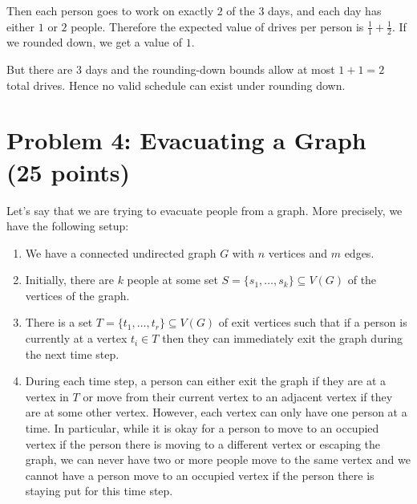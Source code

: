 \documentclass[12pt]{article}
\begin{document}
\begin{enumerate}
Then each person goes to work on exactly $2$ of the $3$ days, and each day has either $1$ or $2$ people. Therefore the expected value of drives per person is $\frac{1}{1} + \frac{1}{2}$. If we rounded down, we get a value of $1$.

But there are $3$ days and the rounding-down
bounds allow at most $1+1=2$ total drives. Hence no valid schedule can exist under rounding down.
\end{enumerate}


\section*{Problem 4: Evacuating a Graph (25 points)}
Let's say that we are trying to evacuate people from a graph. More precisely, we have the following setup:
\begin{enumerate}
\item We have a connected undirected graph $G$ with $n$ vertices and $m$ edges.
\item Initially, there are $k$ people at some set $S = \{s_1,\ldots,s_k\} \subseteq V(G)$ of the vertices of the graph.
\item There is a set $T = \{t_1,\ldots,t_r\} \subseteq V(G)$ of exit vertices such that if a person is currently at a vertex $t_i \in T$ then they can immediately exit the graph during the next time step.
\item During each time step, a person can either exit the graph if they are at a vertex in $T$ or move from their current vertex to an adjacent vertex if they are at some other vertex. However, each vertex can only have one person at a time. In particular, while it is okay for a person to move to an occupied vertex if the person there is moving to a different vertex or escaping the graph, we can never have two or more people move to the same vertex and we cannot have a person move to an occupied vertex if the person there is staying put for this time step. 
\end{enumerate}
\end{document}
